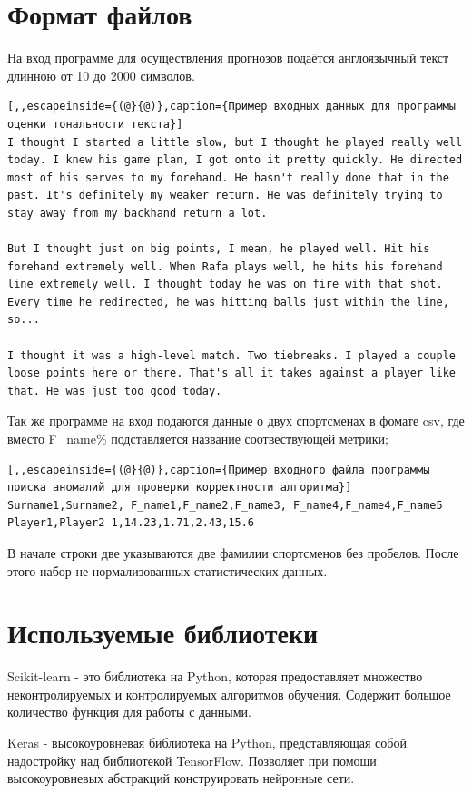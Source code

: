 \section{Формат файлов}
На вход программе для осуществления прогнозов подаётся англоязычный текст длинною от 10 до 2000 символов.
\begin{lstlisting}[,,escapeinside={(@}{@)},caption={Пример входных данных для программы оценки тональности текста}] 
I thought I started a little slow, but I thought he played really well today. I knew his game plan, I got onto it pretty quickly. He directed most of his serves to my forehand. He hasn't really done that in the past. It's definitely my weaker return. He was definitely trying to stay away from my backhand return a lot.

But I thought just on big points, I mean, he played well. Hit his forehand extremely well. When Rafa plays well, he hits his forehand line extremely well. I thought today he was on fire with that shot. Every time he redirected, he was hitting balls just within the line, so...

I thought it was a high-level match. Two tiebreaks. I played a couple loose points here or there. That's all it takes against a player like that. He was just too good today.
\end{lstlisting}

Так же программе на вход подаются данные о двух спортсменах в фомате csv,
где вместо F\_name\% подставляется название соотвествующей метрики;
\begin{lstlisting}[,,escapeinside={(@}{@)},caption={Пример входного файла программы поиска аномалий для проверки корректности алгоритма}] 
Surname1,Surname2, F_name1,F_name2,F_name3, F_name4,F_name4,F_name5
Player1,Player2 1,14.23,1.71,2.43,15.6

\end{lstlisting}
В начале строки две указываются две фамилии спортсменов без пробелов. После этого набор не нормализованных статистических данных.

\section{Используемые библиотеки}

Scikit-learn - это библиотека на Python, которая предоставляет множество неконтролируемых и контролируемых алгоритмов обучения. Содержит большое количество функция для работы  с данными.

Keras - высокоуровневая библиотека на Python, представляющая собой надостройку над библиотекой TensorFlow. Позволяет при помощи высокоуровневых абстракций конструировать нейронные сети.

